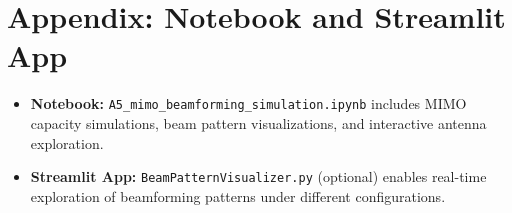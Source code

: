 \section{Appendix: Notebook and Streamlit App}
\begin{itemize}
  \item \textbf{Notebook:} \texttt{A5\_mimo\_beamforming\_simulation.ipynb} includes MIMO capacity simulations, beam pattern visualizations, and interactive antenna exploration.
  \item \textbf{Streamlit App:} \texttt{BeamPatternVisualizer.py} (optional) enables real-time exploration of beamforming patterns under different configurations.
\end{itemize}
